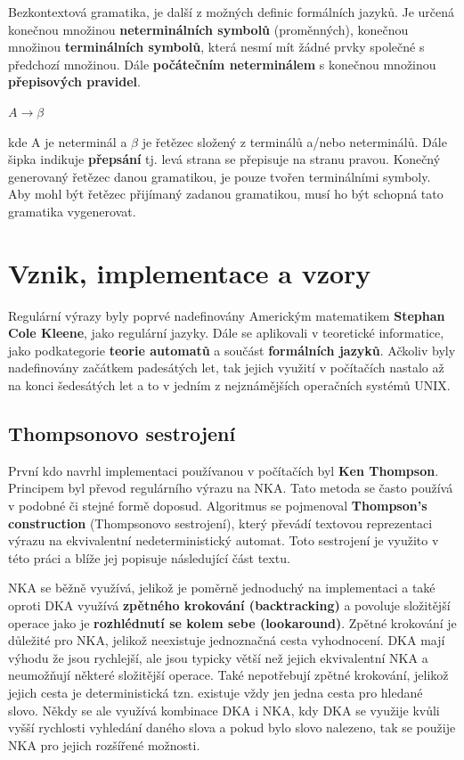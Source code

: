 Bezkontextová gramatika, je další z možných definic formálních jazyků. Je určená konečnou množinou \textbf{neterminálních symbolů} (proměnných), konečnou množinou \textbf{terminálních symbolů}, která nesmí mít žádné prvky společné s předchozí množinou.
Dále \textbf{počátečním neterminálem} s konečnou množinou \textbf{přepisových pravidel}\cite{MUNIFL}.

$A \longrightarrow \beta$

\noindent 
kde A je neterminál a $\beta$ je řetězec složený z terminálů a/nebo neterminálů. 
Dále šipka indikuje \textbf{přepsání} tj. levá strana se přepisuje na stranu pravou.
Konečný generovaný řetězec danou gramatikou, je pouze tvořen terminálními symboly.
Aby mohl být řetězec přijímaný zadanou gramatikou, musí ho být schopná tato gramatika vygenerovat.

\section{Vznik, implementace a vzory}
Regulární výrazy byly poprvé nadefinovány Americkým matematikem \textbf{Stephan Cole Kleene}, jako regulární jazyky. 
Dále se aplikovali v teoretické informatice, jako podkategorie \textbf{teorie automatů} a součást \textbf{formálních jazyků}.
Ačkoliv byly nadefinovány začátkem padesátých let, tak jejich využití v počítačích nastalo až na konci šedesátých let a to v 
jedním z nejznámějších operačních systémů UNIX.

\subsection*{Thompsonovo sestrojení}

První kdo navrhl implementaci používanou v počítačích byl \textbf{Ken Thompson}.
Principem byl převod regulárního výrazu na NKA.
Tato metoda se často používá v podobné či stejné formě doposud.
Algoritmus se pojmenoval \textbf{Thompson's construction} (Thompsonovo sestrojení), který převádí textovou reprezentaci výrazu na ekvivalentní nedeterministický automat.
Toto sestrojení je využito v této práci a blíže jej popisuje následující část textu.

NKA se běžně využívá, jelikož je poměrně jednoduchý na implementaci a
také oproti DKA využívá \textbf{zpětného krokování (backtracking)} a povoluje složitější operace jako je \textbf{rozhlédnutí se kolem sebe (lookaround)}.
Zpětné krokování je důležité pro NKA, jelikož neexistuje jednoznačná cesta vyhodnocení.
DKA mají výhodu že jsou rychlejší, ale jsou typicky větší než jejich ekvivalentní NKA a neumožňují některé složitější operace.
Také nepotřebují zpětné krokování, jelikož jejich cesta je deterministická tzn. existuje vždy jen jedna cesta pro hledané slovo.
Někdy se ale využívá kombinace DKA i NKA, kdy DKA se využije kvůli vyšší rychlosti vyhledání daného slova a pokud bylo slovo nalezeno, 
tak se použije NKA pro jejich rozšířené možnosti.

